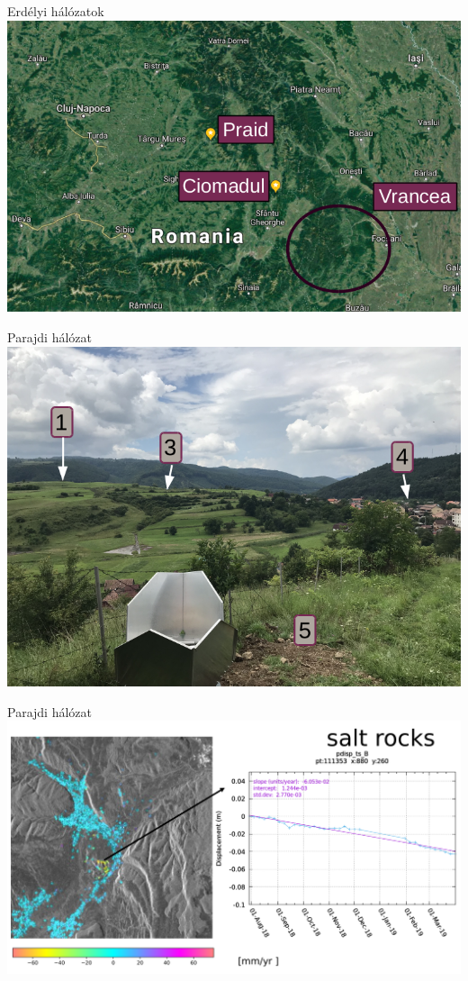\documentclass{beamer}
\begin{document}
\begin{frame}{Erdélyi hálózatok}
\includegraphics[width=\textwidth]{praid_ciomadul.png}
\end{frame}


\begin{frame}{Parajdi hálózat}
\includegraphics[width=\textwidth]{praid_refl.png}
\end{frame}


\begin{frame}{Parajdi hálózat}
\includegraphics[width=\textwidth]{parajd_ts1.png}
\end{frame}
\end{document}
